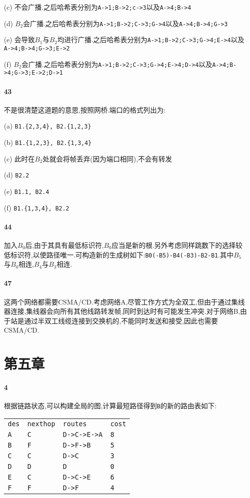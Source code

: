 \documentclass[a4paper]{article}
\begin{document}
(c) 不会广播.之后哈希表分别为\verb|A->1;B->2;c->3|以及\verb|A->4;B->4|

(d) $B_2$会广播.之后哈希表分别为\verb|A->1;B->2;C->3;G->4|以及\verb|A->4;B->4;G->3|

(e) 会导致$B_1$与$B_2$均进行广播.之后哈希表分别为\verb|A->1;B->2;C->3;G->4;E->4|以及\verb|A->4;B->4;G->3;E->2|

(f) $B_2$会广播.之后哈希表分别为\verb|A->1;B->2;C->3;G->4;E->4;D->4|以及\verb|A->4;B->4;G->3;E->2;D->1|
\paragraph{43}
不是很清楚这道题的意思,按照网桥.端口的格式列出为:

(a) \verb|B1.{2,3,4}, B2.{1,2,3}|

(b) \verb|B1.{1,2,3}, B2.{1,3,4}|

(c) 此时在$B_2$处就会将帧丢弃(因为端口相同),不会有转发

(d) \verb|B2.2|

(e) \verb|B1.1, B2.4|

(f) \verb|B1.{1,3,4}, B2.2|
\paragraph{44}
加入$B_0$后,由于其具有最低标识符,$B_0$应当是新的根.另外考虑同样跳数下的选择较低标识符,以使路径唯一.可构造新的生成树如下:\verb|B0(-B5)-B4(-B3)-B2-B1|.其中$B_5$与$B_0$相连,$B_4$与$B_3$相连.
\paragraph{47}
这两个网络都需要CSMA/CD.考虑网络A,尽管工作方式为全双工,但由于通过集线器连接,集线器会向所有其他线路转发帧,同时到达时有可能发生冲突.对于网络B,由于站是通过半双工线缆连接到交换机的,不能同时发送和接受,因此也需要CSMA/CD.
\section{第五章}
\paragraph{4}
根据链路状态,可以构建全局的图,计算最短路径得到\verb|B|的新的路由表如下:
\begin{table}[H]
    \begin{tabular}{|llll|}
        \hline
        \verb|des| & \verb|nexthop| & \verb|routes|     & \verb|cost| \\
        \verb|A|   & \verb|C|       & \verb|D->C->E->A| & \verb|8|    \\
        \verb|B|   & \verb|F|       & \verb|D->F->B|    & \verb|5|    \\
        \verb|C|   & \verb|C|       & \verb|D->C|       & \verb|3|    \\
        \verb|D|   & \verb|D|       & \verb|D|          & \verb|0|    \\
        \verb|E|   & \verb|C|       & \verb|D->C->E|    & \verb|6|    \\
        \verb|F|   & \verb|F|       & \verb|D->F|       & \verb|4|    \\ \hline
    \end{tabular}
\end{table}
\end{document}
